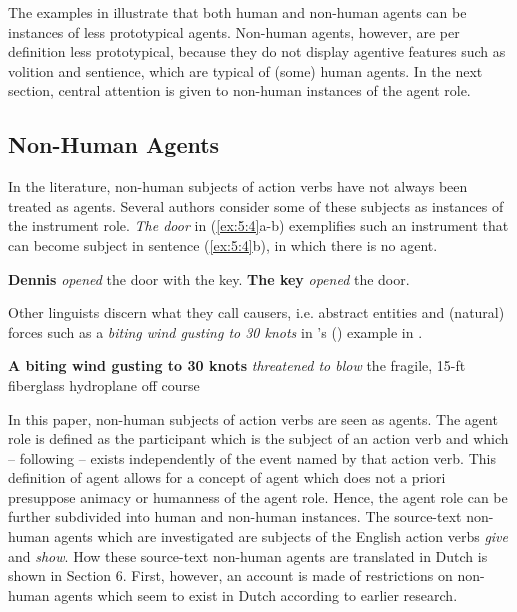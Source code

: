 \documentclass[output=paper]{LSP/langsci}
\begin{document}

The examples in  illustrate that both human and non-human agents can be instances of less prototypical agents. Non-human agents, however, are per definition less prototypical, because they do not display agentive features such as volition and sentience, which are typical of (some) human agents. In the next section, central attention is given to non-human instances of the agent role.

\subsection{Non-Human Agents} 

In the literature, non-human subjects of action verbs have not always been treated as agents. Several authors \citep[see e.g.][]{Fillmore1968,Quirk1972,Levin1993} consider some of these subjects as instances of the instrument role. \textit{The door} in (\ref{ex:5:4}a-b) exemplifies such an instrument that can become subject in sentence (\ref{ex:5:4}b), in which there is no agent.

\ea \label{ex:5:4}
\ea \textbf{Dennis} \textit{opened} the door with the key.
\ex \textbf{The key} \textit{opened} the door. 
\z
\z

Other linguists \citep[see e.g.][]{Biber1999,Talmy2000} discern what they call causers, i.e. abstract entities and (natural) forces such as a \textit{biting wind gusting to 30 knots} in \citeauthor{Biber1999}’s (\citeyear{Biber1999}) example in .

\ea \label{ex:5:5}
\ea \textbf{A biting wind gusting to 30 knots} \textit{threatened to blow} the fragile, 15-ft fiberglass hydroplane off course
\z
\z

In this paper, non-human subjects of action verbs are seen as agents. The agent role is defined as the participant which is the subject of an action verb and which – following \citet{Dowty1991} – exists independently of the event named by that action verb. This definition of agent allows for a concept of agent which does not a priori presuppose animacy or humanness of the agent role. Hence, the agent role can be further subdivided into human and non-human instances. The source-text non-human agents which are investigated are subjects of the English action verbs \textit{give} and \textit{show}. How these source-text non-human agents are translated in Dutch is shown in Section 6. First, however, an account is made of restrictions on non-human agents which seem to exist in Dutch according to earlier research.
\end{document}
